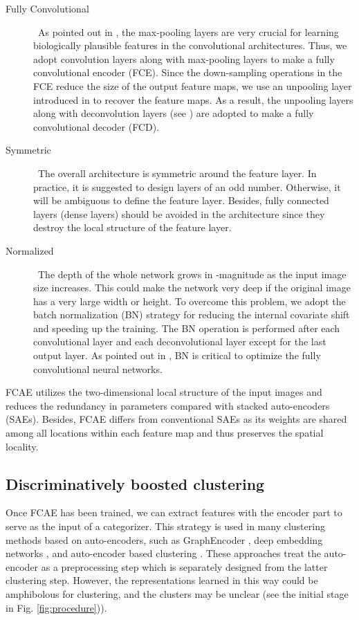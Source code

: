 \documentclass[preprint,12pt]{elsarticle}
\begin{document}
\begin{description}
\item[Fully Convolutional]~As pointed out in \cite{Masci2011SCAE}, the max-pooling layers are very crucial
for learning biologically plausible features in the convolutional architectures. Thus, we adopt convolution layers
along with max-pooling layers to make a fully convolutional encoder (FCE). Since the down-sampling operations
in the FCE reduce the size of the output feature maps, we use an unpooling layer introduced
in \cite{Noh2015deconvolution} to recover the feature maps. As a result, the unpooling layers along
with deconvolution layers (see \cite{Noh2015deconvolution}) are adopted to make a fully convolutional decoder (FCD).
\item[Symmetric]~The overall architecture is symmetric around the feature layer. In practice,
it is suggested to design layers of an odd number. Otherwise, it will be ambiguous to define the feature layer.
Besides, fully connected layers (dense layers) should be avoided in the architecture since they destroy the
local structure of the feature layer.
\item[Normalized]~The depth of the whole network grows in -magnitude as the input image size increases.
This could make the network very deep if the original image has a very large width or height. To overcome this
problem, we adopt the batch normalization (BN) \cite{Ioffe2015BN} strategy for reducing the internal covariate
shift and speeding up the training. The BN operation is performed after each convolutional layer and each
deconvolutional layer except for the last output layer. As pointed out in \cite{Noh2015deconvolution},
BN is critical to optimize the fully convolutional neural networks.
\end{description}

FCAE utilizes the two-dimensional local structure of the input images and reduces the redundancy in parameters
compared with stacked auto-encoders (SAEs). Besides, FCAE differs from conventional SAEs as its weights are
shared among all locations within each feature map and thus preserves the spatial locality.


\subsection{Discriminatively boosted clustering}

\label{sec:dbc}

Once FCAE has been trained, we can extract features with the encoder part to serve as the input of a categorizer.
This strategy is used in many clustering methods based on auto-encoders, such as GraphEncoder \cite{Tian2014graph},
deep embedding networks \cite{Huang2014DEN}, and auto-encoder based clustering \cite{Song2013AEC}.
These approaches treat the auto-encoder as a preprocessing step which is separately designed from the latter
clustering step. However, the representations learned in this way could be amphibolous for clustering,
and the clusters may be unclear (see the initial stage in Fig. \ref{fig:procedure})).
\end{document}
